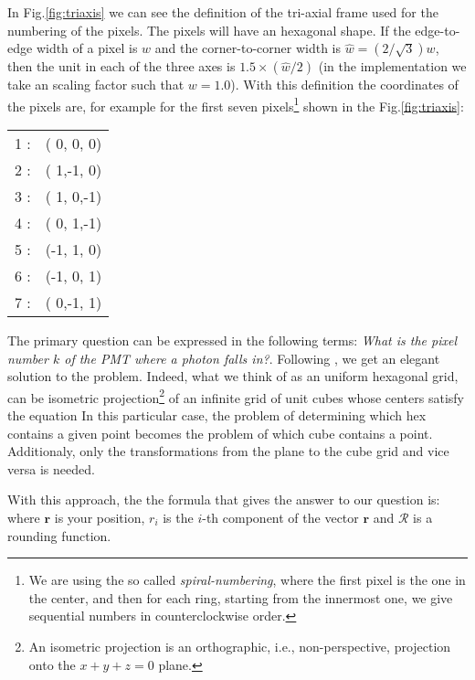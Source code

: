 In Fig.\ref{fig:triaxis} we can see the definition of the tri-axial
frame used for the numbering of the pixels. The pixels will have an
hexagonal shape. If the edge-to-edge width of a pixel is $w$ and the
corner-to-corner width is $\hat{w}=(2/\sqrt{3}) w$, then the unit in
each of the three axes is $1.5\times (\hat{w}/2)$ (in the
implementation we take an scaling factor such that $w=1.0$).  With
this definition the coordinates of the pixels are, for example for the
first seven pixels\footnote{We are using the so called
  \emph{spiral-numbering}, where the first pixel is the one in the
  center, and then for each ring, starting from the innermost one, we
  give sequential numbers in counterclockwise order.} shown in the
Fig.\ref{fig:triaxis}:
%
\begin{center}
  \begin{tabular}{rc}
    1 :& ( 0, 0, 0) \\
    2 :& ( 1,-1, 0) \\
    3 :& ( 1, 0,-1) \\
    4 :& ( 0, 1,-1) \\
    5 :& (-1, 1, 0) \\
    6 :& (-1, 0, 1) \\
    7 :& ( 0,-1, 1) \\
  \end{tabular}
\end{center}

The primary question can be expressed in the following terms:
\emph{What is the pixel number $k$ of the PMT where a photon falls
  in?}.  Following \cite{Fu:hexgrid}, we get an elegant solution to
the problem. Indeed, what we think of as an uniform hexagonal grid,
can be isometric projection\footnote{An isometric projection is an
  orthographic, i.e., non-perspective, projection onto the $x+y+z=0$
  plane.} of an infinite grid of unit cubes whose centers satisfy the
equation
%
\planeeq
%
In this particular case, the problem of determining which hex contains
a given point becomes the problem of which cube contains a point.
Additionaly, only the transformations from the plane to the cube grid
and vice versa is needed.

With this approach, the the formula that gives the answer to our
question is:
%
\hexgrideq
%
where $\mathbf{r}$ is your position, $r_i$ is the $i$-th component of
the vector $\mathbf{r}$ and $\mathcal{R}$ is a rounding function.

\axesfigs



